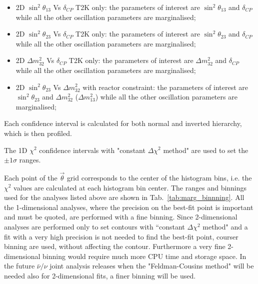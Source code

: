 \begin{itemize}
\item 
2D $\sin^2 \theta_{13}$ Vs $\delta_{CP}$ T2K only: 
the parameters of interest are $\sin^2 \theta_{13}$ and $\delta_{CP}$ while
all the other oscillation parameters are marginalised;

\item 
2D $\sin^2 \theta_{23}$ Vs $\delta_{CP}$ T2K only: 
the parameters of interest are $\sin^2 \theta_{23}$ and $\delta_{CP}$ while
all the other oscillation parameters are marginalised;

\item 
2D $\Delta m^2_{32}$ Vs $\delta_{CP}$ T2K only: 
the parameters of interest are $\Delta m^2_{32}$ and $\delta_{CP}$ while
all the other oscillation parameters are marginalised;

\item 
2D $\sin^2 \theta_{23}$ Vs $\Delta m^2_{32}$ with reactor constraint: 
the parameters of interest are $\sin^2 \theta_{23}$ and $\Delta m^2_{32}$ ($\Delta m^2_{13}$) 
while all the other oscillation parameters are marginalised;

\end{itemize}

Each confidence interval is calculated for both normal and inverted hierarchy,
which is then profiled.

The 1D $\chi^2$ confidence intervals with "constant $\Delta \chi^2$ method" are used to set the $\pm 1 \sigma$ ranges.

Each point of the $\vec{\theta}$ grid corresponds to the center of the histogram bins,
i.e. the $\chi^2$ values are calculated at each histogram bin center. 
The ranges and binnings used for the analyses listed above are shown in Tab.~\ref{tab:marg_binnning}.
All the 1-dimensional analyses, where the precision on the best-fit point is important 
and must be quoted, are performed with a fine binning.
Since 2-dimensional analyses are performed only to set contours with ``constant $\Delta \chi^2$ method"
and a fit with a very high precision is not needed to find the best-fit point, 
courser binning are used, without affecting the contour.
Furthermore a very fine 2-dimensional binning would require much more CPU time and storage space.
In the future $\bar{\nu}/\nu$ joint analysis releases when the "Feldman-Cousins method" will be needed 
also for 2-dimensional fits, a finer binning will be used.

